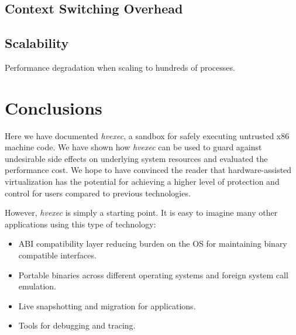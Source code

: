 \documentclass{article}
\newcommand{\PROJNAME}{\textit{hvexec}}
\begin{document}
\subsection{Context Switching Overhead}
\subsection{Scalability}
Performance degradation when scaling to hundreds of processes.

\section{Conclusions}
Here we have documented \PROJNAME{}, a sandbox for safely executing untrusted x86 machine code.
We have shown how \PROJNAME{} can be used to guard against undesirable side effects on underlying system resources and evaluated the performance cost.
We hope to have convinced the reader that hardware-assisted virtualization has the potential for achieving a higher level of protection and control for users compared to previous technologies.

However, \PROJNAME{} is simply a starting point. It is easy to imagine many other applications using this type of technology:

\begin{itemize}
    \item
        ABI compatibility layer reducing burden on the OS for maintaining binary compatible interfaces.
    \item
        Portable binaries across different operating systems and foreign system call emulation.
    \item
        Live snapshotting and migration for applications.
    \item
        Tools for debugging and tracing.
\end{itemize}
\end{document}
